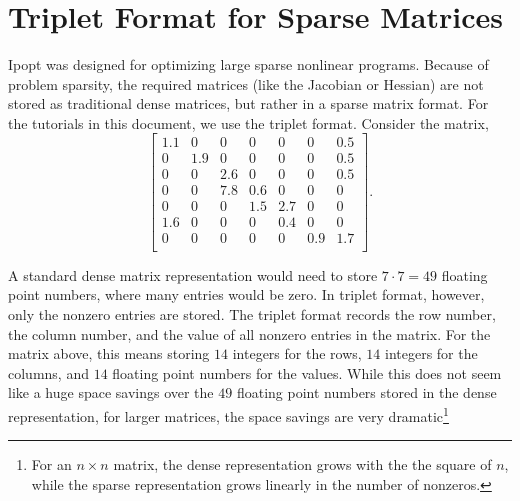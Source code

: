 \documentclass[letter,10pt]{article}
\begin{document}
{\appendix
\section{Triplet Format for Sparse Matrices}\label{app.triplet}
Ipopt was designed for optimizing large sparse nonlinear programs. 
Because of problem sparsity, the required matrices (like the Jacobian or Hessian) are not stored as traditional dense matrices, but rather in a sparse matrix format. For the tutorials in this document, we use the triplet format. 
Consider the matrix,
\[
\left[
\begin{array}{ccccccc}
1.1     & 0             & 0             & 0             & 0             & 0             & 0.5 \\
0       & 1.9   & 0             & 0             & 0             & 0             & 0.5 \\
0       & 0             & 2.6   & 0             & 0             & 0             & 0.5 \\
0       & 0             & 7.8   & 0.6   & 0             & 0             & 0    \\
0       & 0             & 0             & 1.5   & 2.7   & 0             & 0     \\
1.6     & 0             & 0             & 0             & 0.4   & 0             & 0     \\
0       & 0             & 0             & 0             & 0             & 0.9   & 1.7 \\
\end{array}
\right].
\]

A standard dense matrix representation would need to store $7 \cdot
7{=} 49$ floating point numbers, where many entries would be zero. In
triplet format, however, only the nonzero entries are stored. The
triplet format records the row number, the column number, and the
value of all nonzero entries in the matrix. For the matrix above, this
means storing $14$ integers for the rows, $14$ integers for the
columns, and $14$ floating point numbers for the values. While this
does not seem like a huge space savings over the $49$ floating point
numbers stored in the dense representation, for larger matrices, the
space savings are very dramatic\footnote{For an $n \times n$ matrix,
  the dense representation grows with the the square of $n$, while the
  sparse representation grows linearly in the number of nonzeros.}

}
\end{document}
